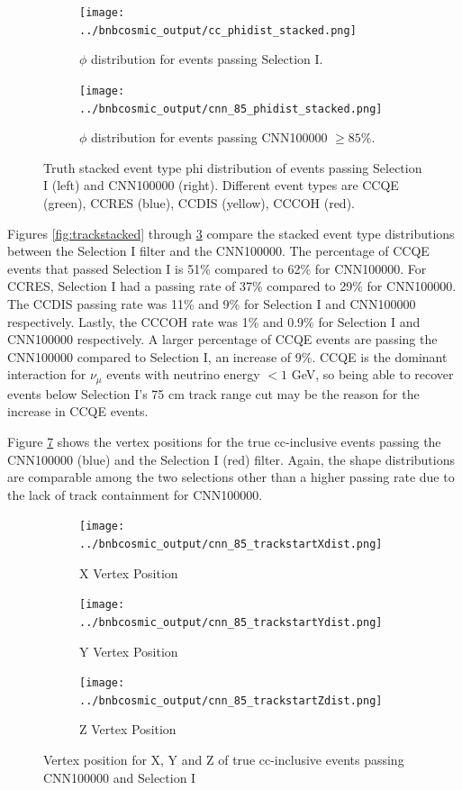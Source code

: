\begin{figure}[htp!]
\centering
	\begin{subfigure}[b]{.475\textwidth}
	\centering
		\texttt{[image: ../bnbcosmic\_output/cc\_phidist\_stacked.png]}
		\caption{$\phi$ distribution for events passing Selection I.} 
		\label{fig:ccphistacked}
	\end{subfigure}
	\quad
	\begin{subfigure}[b]{.475\textwidth}
	\centering
		\texttt{[image: ../bnbcosmic\_output/cnn\_85\_phidist\_stacked.png]}
		\caption{$\phi$ distribution for events passing CNN100000 $\geq 85\%$.} 
		\label{fig:cnn85phistacked}
	\end{subfigure}
\caption{Truth stacked event type phi distribution of events passing Selection I (left) and CNN100000 (right). Different event types are CCQE (green), CCRES (blue), CCDIS (yellow), CCCOH (red).}
\label{fig:phistacked}
\end{figure}
Figures \ref{fig:trackstacked} through \ref{fig:phistacked} compare the stacked event type distributions between the Selection I filter and the CNN100000. The percentage of CCQE events that passed Selection I is 51\% compared to 62\% for CNN100000. For CCRES, Selection I had a passing rate of 37\% compared to 29\% for CNN100000. The CCDIS passing rate was 11\% and 9\% for Selection I and CNN100000 respectively. Lastly, the CCCOH rate was 1\% and 0.9\% for Selection I and CNN100000 respectively. A larger percentage of CCQE events are passing the CNN100000 compared to Selection I, an increase of 9\%. CCQE is the dominant interaction for $\nu_{\mu}$ events with neutrino energy $<1$ GeV, so being able to recover events below Selection I's 75 cm track range cut may be the reason for the increase in CCQE events. 
  
Figure \ref{fig:vertex} shows the vertex positions for the true cc-inclusive events passing the CNN100000 (blue) and the Selection I (red) filter. Again, the shape distributions are comparable among the two selections other than a higher passing rate due to the lack of track containment for CNN100000.  
\begin{figure}[htp!]
\centering
	\begin{subfigure}[b]{.55\textwidth}
	\centering
		\texttt{[image: ../bnbcosmic\_output/cnn\_85\_trackstartXdist.png]}
		\caption{X Vertex Position} 
		\label{fig:cnn85vertexX}
	\end{subfigure}
	\quad
	\begin{subfigure}[b]{.55\textwidth}
	\centering
		\texttt{[image: ../bnbcosmic\_output/cnn\_85\_trackstartYdist.png]}
		\caption{Y Vertex Position} 
		\label{fig:cnn85vertexY}
	\end{subfigure}
	\quad
	\begin{subfigure}[b]{.55\textwidth}
	\centering
		\texttt{[image: ../bnbcosmic\_output/cnn\_85\_trackstartZdist.png]}
		\caption{Z Vertex Position} 
		\label{fig:cnn85vertexZ}
	\end{subfigure}
\caption{Vertex position for X, Y and Z of true cc-inclusive events passing CNN100000 and Selection I}
\label{fig:vertex}
\end{figure}


